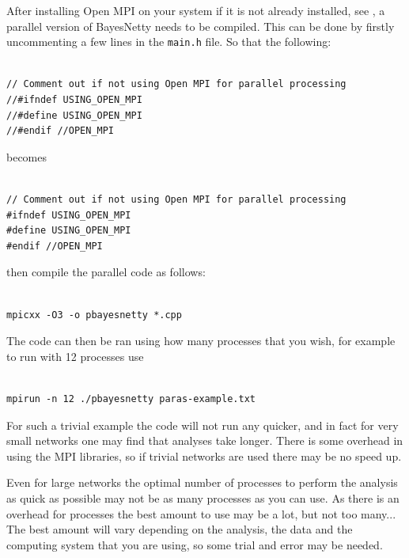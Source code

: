 \documentclass[a4paper,12pt]{article}
\newcommand{\code}[1]{{\footnotesize{{\tt #1}}}}
\begin{document}
After installing Open MPI on your system if it is not already installed, see \citet{openmpi}, a parallel version of BayesNetty needs to be compiled. This can be done by firstly uncommenting a few lines in the \code{main.h} file. So that the following: 
\vspace{0.35cm} \begin{lstlisting}

// Comment out if not using Open MPI for parallel processing
//#ifndef USING_OPEN_MPI
//#define USING_OPEN_MPI
//#endif //OPEN_MPI

\end{lstlisting} \vspace{0.35cm}
becomes 
\vspace{0.35cm} \begin{lstlisting}

// Comment out if not using Open MPI for parallel processing
#ifndef USING_OPEN_MPI
#define USING_OPEN_MPI
#endif //OPEN_MPI

\end{lstlisting} \vspace{0.35cm}
then compile the parallel code as follows: 
\vspace{0.35cm} \begin{lstlisting}

mpicxx -O3 -o pbayesnetty *.cpp

\end{lstlisting} \vspace{0.35cm}
The code can then be ran using how many processes that you wish, for example to run with 12 processes use 
\vspace{0.35cm} \begin{lstlisting}

mpirun -n 12 ./pbayesnetty paras-example.txt

\end{lstlisting} \vspace{0.35cm}
For such a trivial example the code will not run any quicker, and in fact for very small networks one may find that analyses take longer. There is some overhead in using the MPI libraries, so if trivial networks are used there may be no speed up. 

Even for large networks the optimal number of processes to perform the analysis as quick as possible may not be as many processes as you can use. As there is an overhead for processes the best amount to use may be a lot, but not too many... The best amount will vary depending on the analysis, the data and the computing system that you are using, so some trial and error may be needed. 
\end{document}

